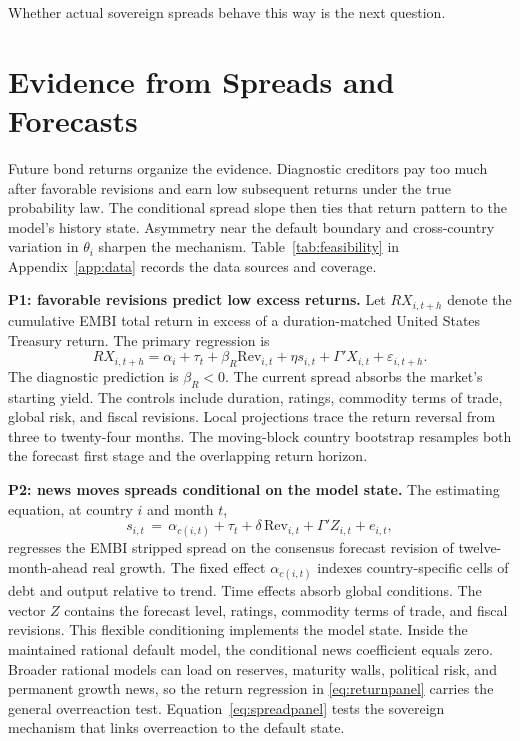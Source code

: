 \documentclass[11pt]{article}
\theoremstyle{definition}
\begin{document}
Whether actual sovereign spreads behave this way is the next question.

\section{Evidence from Spreads and Forecasts}\label{sec:evidence}

Future bond returns organize the evidence. Diagnostic creditors pay too much after favorable revisions and earn low subsequent returns under the true probability law. The conditional spread slope then ties that return pattern to the model's history state. Asymmetry near the default boundary and cross-country variation in $\theta_i$ sharpen the mechanism. Table~\ref{tab:feasibility} in Appendix~\ref{app:data} records the data sources and coverage.

\medskip
\noindent\textbf{P1: favorable revisions predict low excess returns.} Let $RX_{i,t+h}$ denote the cumulative EMBI total return in excess of a duration-matched United States Treasury return. The primary regression is
\begin{equation}
RX_{i,t+h}=\alpha_i+\tau_t+\beta_R\mathrm{Rev}_{i,t}
+\eta s_{i,t}+\Gamma'X_{i,t}+\varepsilon_{i,t+h}.
\label{eq:returnpanel}
\end{equation}
The diagnostic prediction is $\beta_R<0$. The current spread absorbs the market's starting yield. The controls include duration, ratings, commodity terms of trade, global risk, and fiscal revisions. Local projections trace the return reversal from three to twenty-four months. The moving-block country bootstrap resamples both the forecast first stage and the overlapping return horizon.

\medskip
\noindent\textbf{P2: news moves spreads conditional on the model state.} The estimating equation, at country $i$ and month $t$,
\begin{equation}
s_{i,t} \,=\, \alpha_{c(i,t)} + \tau_t + \delta\, \mathrm{Rev}_{i,t} + \Gamma' Z_{i,t} + e_{i,t},
\label{eq:spreadpanel}
\end{equation}
regresses the EMBI stripped spread on the consensus forecast revision of twelve-month-ahead real growth. The fixed effect $\alpha_{c(i,t)}$ indexes country-specific cells of debt and output relative to trend. Time effects absorb global conditions. The vector $Z$ contains the forecast level, ratings, commodity terms of trade, and fiscal revisions. This flexible conditioning implements the model state. Inside the maintained rational default model, the conditional news coefficient equals zero. Broader rational models can load on reserves, maturity walls, political risk, and permanent growth news, so the return regression in \eqref{eq:returnpanel} carries the general overreaction test. Equation~\eqref{eq:spreadpanel} tests the sovereign mechanism that links overreaction to the default state.
\end{document}
